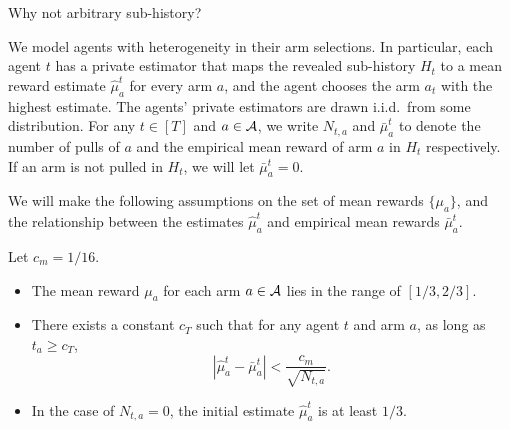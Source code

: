 \iffalse
\begin{itemize}
\item \textbf{Full history:} We show each agent the history of all previous agents' pulls. We call this policy \ALGG. 
\item \textbf{Unbiased sub-history:} We show each agent only a subset of history. The subsets are pre-determined before any arms are pulled.  
\item \textbf{Info graph:} All the recommendation policies in this paper can be described by an undirected transitive graph with $T$ nodes. We call it the info graph. The $T$ nodes in the graph represent the $T$ agents. If there is an edge between node $u$ and $v$ for $u < v$, it means the history of agent $u$ is shown to agent $v$.
\end{itemize}
\fi

\begin{remark}
  Why not arbitrary sub-history? 
\end{remark}

 We model agents with heterogeneity in their
arm selections. In particular, each agent $t$ has a private estimator
that maps the revealed sub-history $H_t$ to a mean reward estimate
$\hat{\mu}_a^t$ for every arm $a$, and the agent chooses the arm $a_t$
with the highest estimate. The agents' private estimators are drawn
i.i.d.~from some distribution. For any $t\in[T]$ and $a\in \mathcal{A}$, we
write $N_{t, a}$ and $\bar{\mu}_a^t$ to denote the number of pulls of
$a$ and the empirical mean reward of arm $a$ in $H_t$ respectively. If
an arm is not pulled in $H_t$, we will let $\bar{\mu}_a^t = 0$.


We will make the following assumptions on the set of mean rewards
$\{\mu_a\}$, and the relationship between the estimates $\hat \mu_a^t$
and empirical mean rewards $\bar\mu_a^t$.



\begin{assumption}
\label{ass:embehave}
Let $c_m = 1/16$. 
\begin{itemize}
\item The mean reward $\mu_a$ for each arm $a\in \mathcal{A}$ lies in the range
  of $[1/3, 2/3]$.


\item There exists a constant $c_T$ such that for any agent $t$ and
  arm $a$, as long as $t_a \geq c_T$,
\[
  \left|\hat{\mu}^t_a - \bar{\mu}^t_a \right| <
  \frac{c_m}{\sqrt{N_{t,a}}}.
\]
\item In the case of $N_{t,a} = 0$, the initial estimate
  $\hat{\mu}^t_a$ is at least $1/3$.
\end{itemize}
\end{assumption}


